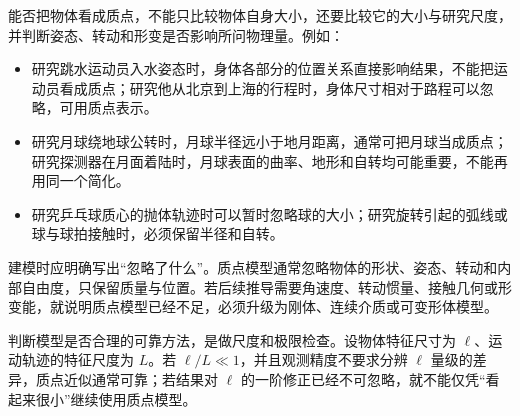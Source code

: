 {能否把物体看成质点，不能只比较物体自身大小，还要比较它的大小与研究尺度，并判断姿态、转动和形变是否影响所问物理量。例如：

\begin{itemize}
  \item 研究跳水运动员入水姿态时，身体各部分的位置关系直接影响结果，不能把运动员看成质点；研究他从北京到上海的行程时，身体尺寸相对于路程可以忽略，可用质点表示。
  \item 研究月球绕地球公转时，月球半径远小于地月距离，通常可把月球当成质点；研究探测器在月面着陆时，月球表面的曲率、地形和自转均可能重要，不能再用同一个简化。
  \item 研究乒乓球质心的抛体轨迹时可以暂时忽略球的大小；研究旋转引起的弧线或球与球拍接触时，必须保留半径和自转。
\end{itemize}

\EarthMoonScaleDiagram

建模时应明确写出“忽略了什么”。质点模型通常忽略物体的形状、姿态、转动和内部自由度，只保留质量与位置。若后续推导需要角速度、转动惯量、接触几何或形变能，就说明质点模型已经不足，必须升级为刚体、连续介质或可变形体模型。

判断模型是否合理的可靠方法，是做尺度和极限检查。设物体特征尺寸为 $\ell$、运动轨迹的特征尺度为 $L$。若 $\ell/L\ll1$，并且观测精度不要求分辨 $\ell$ 量级的差异，质点近似通常可靠；若结果对 $\ell$ 的一阶修正已经不可忽略，就不能仅凭“看起来很小”继续使用质点模型。
}

